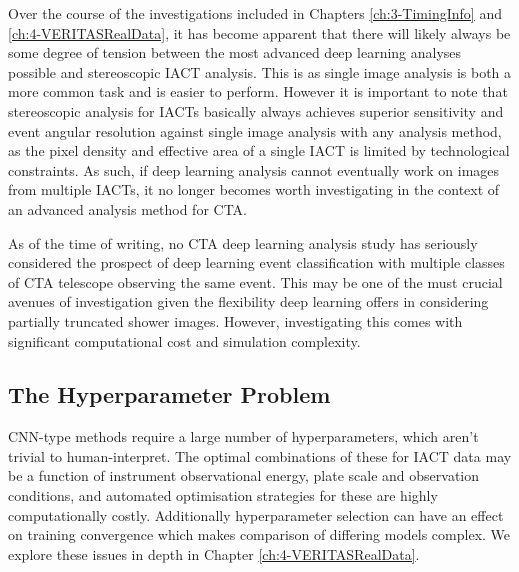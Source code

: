 Over the course of the investigations included in Chapters \ref{ch:3-TimingInfo} and \ref{ch:4-VERITASRealData}, it has become apparent that there will likely always be some degree of tension between the most advanced deep learning analyses possible and stereoscopic IACT analysis. This is as single image analysis is both a more common task and is easier to perform.  However it is important to note that stereoscopic analysis for IACTs basically always achieves superior sensitivity and event angular resolution against single image analysis with any analysis method, as the pixel density and effective area of a single IACT is limited by technological constraints. As such, if deep learning analysis cannot eventually work on images from multiple IACTs, it no longer becomes worth investigating in the context of an advanced analysis method for CTA.

As of the time of writing, no CTA deep learning analysis study has seriously considered the prospect of deep learning event classification with multiple classes of CTA telescope observing the same event. This may be one of the must crucial avenues of investigation given the flexibility deep learning offers in considering partially truncated shower images. However, investigating this comes with significant computational cost and simulation complexity.

\subsection{The Hyperparameter Problem}
CNN-type methods require a large number of hyperparameters, which aren't trivial to human-interpret. The optimal combinations of these for IACT data may be a function of instrument observational energy, plate scale and observation conditions, and automated optimisation strategies for these are highly computationally costly. Additionally hyperparameter selection can have an effect on training convergence which makes comparison of differing models complex. We explore these issues in depth in Chapter \ref{ch:4-VERITASRealData}.

